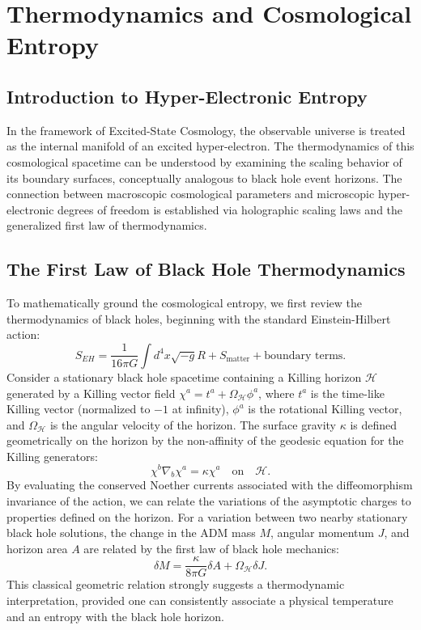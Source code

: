 \section{Thermodynamics and Cosmological Entropy}
\label{ch:thermo_entropy}

\subsection{Introduction to Hyper-Electronic Entropy}
In the framework of Excited-State Cosmology, the observable universe is treated as the internal manifold of an excited hyper-electron. The thermodynamics of this cosmological spacetime can be understood by examining the scaling behavior of its boundary surfaces, conceptually analogous to black hole event horizons. The connection between macroscopic cosmological parameters and microscopic hyper-electronic degrees of freedom is established via holographic scaling laws and the generalized first law of thermodynamics. \cite{Linde1982, Mather1990, Penzias1965}

\subsection{The First Law of Black Hole Thermodynamics}
To mathematically ground the cosmological entropy, we first review the thermodynamics of black holes, beginning with the standard Einstein-Hilbert action:
\begin{equation}
S_{EH} = \frac{1}{16\pi G} \int d^4x \sqrt{-g} R + S_{\text{matter}} + \text{boundary terms}.
\end{equation}
Consider a stationary black hole spacetime containing a Killing horizon $\mathcal{H}$ generated by a Killing vector field $\chi^a = t^a + \Omega_\mathcal{H} \phi^a$, where $t^a$ is the time-like Killing vector (normalized to $-1$ at infinity), $\phi^a$ is the rotational Killing vector, and $\Omega_\mathcal{H}$ is the angular velocity of the horizon. The surface gravity $\kappa$ is defined geometrically on the horizon by the non-affinity of the geodesic equation for the Killing generators:
\begin{equation}
\chi^b \nabla_b \chi^a = \kappa \chi^a \quad \text{on} \quad \mathcal{H}.
\end{equation}
By evaluating the conserved Noether currents associated with the diffeomorphism invariance of the action, we can relate the variations of the asymptotic charges to properties defined on the horizon. For a variation between two nearby stationary black hole solutions, the change in the ADM mass $M$, angular momentum $J$, and horizon area $A$ are related by the first law of black hole mechanics:
\begin{equation}
\delta M = \frac{\kappa}{8\pi G} \delta A + \Omega_\mathcal{H} \delta J.
\end{equation}
This classical geometric relation strongly suggests a thermodynamic interpretation, provided one can consistently associate a physical temperature and an entropy with the black hole horizon.

